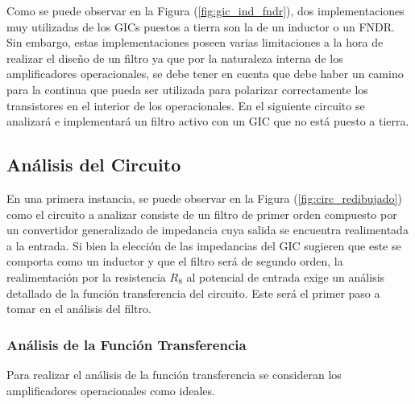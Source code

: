 
Como se puede observar en la Figura (\ref{fig:gic_ind_fndr}), dos implementaciones muy utilizadas de los GICs puestos a tierra son la de un inductor o un FNDR. Sin embargo, estas implementaciones poseen varias limitaciones a la hora de realizar el diseño de un filtro ya que por la naturaleza interna de los amplificadores operacionales, se debe tener en cuenta que debe haber un camino para la continua que pueda ser utilizada para polarizar correctamente los transistores en el interior de los operacionales. En el siguiente circuito se analizará e implementará un filtro activo con un GIC que no está puesto a tierra.


\subsection{Análisis del Circuito}

En una primera instancia, se puede observar en la Figura (\ref{fig:circ_redibujado}) como el circuito a analizar consiste de un filtro de primer orden compuesto por un convertidor generalizado de impedancia cuya salida se encuentra realimentada a la entrada. Si bien la elección de las impedancias del GIC sugieren que este se comporta como un inductor y que el filtro será de segundo orden, la realimentación por la resistencia $R_8$ al potencial de entrada exige un análisis detallado de la función transferencia del circuito. Este será el primer paso a tomar en el análisis del filtro.

\subsubsection{Análisis de la Función Transferencia}
\label{sec:fun_trans}
Para realizar el análisis de la función transferencia se consideran los amplificadores operacionales como ideales.


